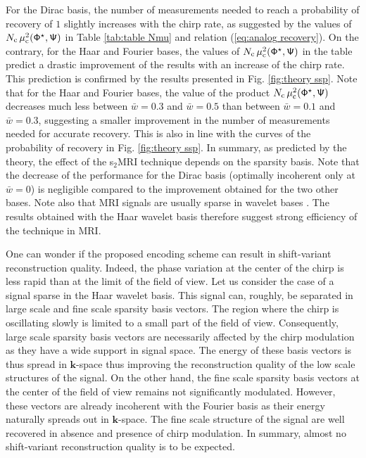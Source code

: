 \documentclass[10pt,draftcls, onecolumn]{IEEEtran}
\begin{document}
For the Dirac basis, the number of measurements needed to reach a probability of recovery of $1$ slightly increases with the chirp rate, as suggested by the values of $N_{\rm c} \, \mu_{\rm c}^2(\mathsf{\Phi}^{\star}, \mathsf{\Psi})$ in Table \ref{tab:table Nmu} and relation (\ref{eq:analog recovery}). On the contrary, for the Haar and Fourier bases, the values of $N_{\rm c} \, \mu_{\rm c}^2(\mathsf{\Phi}^{\star}, \mathsf{\Psi})$ in the table predict a drastic improvement of the results with an increase of the chirp rate. This prediction is confirmed by the results presented in Fig. \ref{fig:theory ssp}. Note that for the Haar and Fourier bases, the value of the product $N_{\rm c} \, \mu_{\rm c}^2(\mathsf{\Phi}^{\star}, \mathsf{\Psi})$ decreases much less between $\bar{w} = 0.3$ and $\bar{w} = 0.5$ than between $\bar{w} = 0.1$ and $\bar{w} = 0.3$, suggesting a smaller improvement in the number of measurements needed for accurate recovery. This is also in line with the curves of the probability of recovery in Fig. \ref{fig:theory ssp}. In summary, as predicted by the theory, the effect of the s$_2$MRI technique depends on the sparsity basis. Note that the decrease of the performance for the Dirac basis (optimally incoherent only at $\bar{w} = 0$) is negligible compared to the improvement obtained for the two other bases. Note also that MRI signals are usually sparse in wavelet bases \cite{lustig07}. The results obtained with the Haar wavelet basis therefore suggest strong efficiency of the technique in MRI.

One can wonder if the proposed encoding scheme can result in shift-variant reconstruction quality. Indeed, the phase variation at the center of the chirp is less rapid than at the limit of the field of view. Let us consider the case of a signal sparse in the Haar wavelet basis. This signal can, roughly, be separated in large scale and fine scale sparsity basis vectors. The region where the chirp is oscillating slowly is limited to a small part of the field of view. Consequently, large scale sparsity basis vectors are necessarily affected by the chirp modulation as they have a wide support in signal space. The energy of these basis vectors is thus spread in $\bm{k}$-space thus improving the reconstruction quality of the low scale structures of the signal. On the other hand, the fine scale sparsity basis vectors at the center of the field of view remains not significantly modulated. However, these vectors are already incoherent with the Fourier basis as their energy naturally spreads out in $\bm{k}$-space. The fine scale structure of the signal are well recovered in absence and presence of chirp modulation. In summary, almost no shift-variant reconstruction quality is to be expected. 
\end{document}
